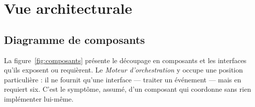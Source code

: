 \section{Vue architecturale}

\subsection{Diagramme de composants}
La figure~\ref{fig:composants} pr\'esente le d\'ecoupage en composants et les
interfaces qu'ils exposent ou requi\`erent. Le \emph{Moteur d'orchestration} y
occupe une position particuli\`ere : il ne fournit qu'une interface --- traiter un
\'ev\'enement --- mais en requiert six. C'est le sympt\^ome, assum\'e, d'un composant qui
coordonne sans rien impl\'ementer lui-m\^eme.

